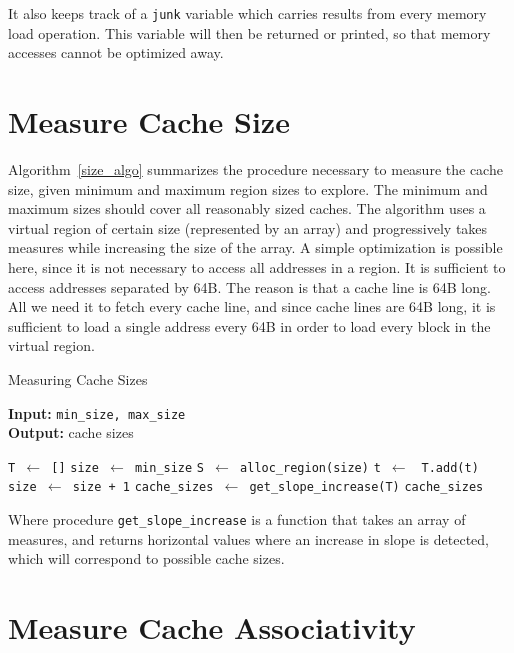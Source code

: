 \documentclass[a4paper,11pt,oneside]{report}
\begin{document}
It also keeps track of a \texttt{junk} variable which carries results from every memory load operation. This variable will then be returned or printed, so that memory accesses cannot be optimized away.

\section{Measure Cache Size}

Algorithm~\ref{size_algo} summarizes the procedure necessary to measure the cache size, given minimum and maximum region sizes to explore. The minimum and maximum sizes should cover all reasonably sized caches. The algorithm uses a virtual region of certain size (represented by an array) and progressively takes measures while increasing the size of the array. A simple optimization is possible here, since it is not necessary to access all addresses in a region. It is sufficient to access addresses separated by 64B. The reason is that a cache line is 64B long. All we need it to fetch every cache line, and since cache lines are 64B long, it is sufficient to load a single address every 64B in order to load every block in the virtual region.

\begin{algorithm}
\caption{Measuring Cache Sizes}\label{size_algo}
\hspace*{\algorithmicindent} \textbf{Input:} \texttt{min\_size, max\_size}\\
\hspace*{\algorithmicindent} \textbf{Output:} cache sizes
\begin{algorithmic}[1]
\State \texttt{T $\gets$ []}
\State \texttt{size $\gets$ min\_size}
\State \texttt{S $\gets$ alloc\_region(size)}
\State \texttt{t $\gets$ }
\State \texttt{T.add(t)}
\State \texttt{size $\gets$ size + 1}
\EndWhile
\State \texttt{cache\_sizes $\gets$ get\_slope\_increase(T)}
\State \Return \texttt{cache\_sizes}
\EndProcedure
\end{algorithmic}
\end{algorithm}

Where procedure \texttt{get\_slope\_increase} is a function that takes an array of measures, and returns horizontal values where an increase in slope is detected, which will correspond to possible cache sizes.

\section{Measure Cache Associativity}
\end{document}
